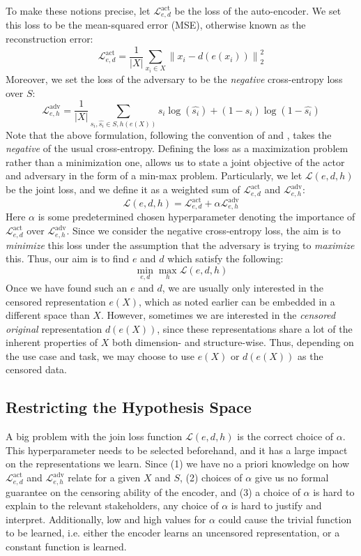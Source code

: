 \documentclass[nohyperref]{article}
\theoremstyle{plain}
\theoremstyle{definition}
\theoremstyle{remark}
\begin{document}
To make these notions precise, let $\mathcal{L}^{\mathop{act}}_{e,d}$ be the loss of the auto-encoder. We set this loss to be the mean-squared error (MSE), otherwise known as the reconstruction error:
\[\mathcal{L}^{\mathop{act}}_{e,d} = \frac{1}{|X|}\sum_{x_i \in X}\left\lVert x_i - d(e(x_i))\right\rVert_2^2\]
Moreover, we set the loss of the adversary to be the \emph{negative} cross-entropy loss over $S$:
\[
\mathcal{L}^{\mathop{adv}}_{e,h} = \frac{1}{|X|} \sum_{s_i, \hat{s_i} \in S, h(e(X))} s_i \mathop{log}(\hat{s_i}) + (1-s_i) \mathop{log}(1-\hat{s_i})
\]
Note that the above formulation, following the convention of \cite{edwards2016censoring} and \cite{pmlr-v80-madras18a}, takes the \emph{negative} of the usual cross-entropy. Defining the loss as a maximization problem rather than a minimization one, allows us to state a joint objective of the actor and adversary in the form of a min-max problem. Particularly, we let $\mathcal{L}(e,d,h)$ be the joint loss, and we define it  as a weighted sum of $\mathcal{L}^{\mathop{act}}_{e,d}$ and $\mathcal{L}^{\mathop{adv}}_{e,h}$:
\[\mathcal{L}(e,d,h) = \mathcal{L}^{\mathop{act}}_{e,d} + \alpha \mathcal{L}^{\mathop{adv}}_{e,h} \]
Here $\alpha$ is some predetermined chosen hyperparameter denoting the importance of $\mathcal{L}^{\mathop{act}}_{e,d}$ over $\mathcal{L}^{\mathop{adv}}_{e,h}$. Since we consider the negative cross-entropy loss, the aim is to \emph{minimize} this loss under the assumption that the adversary is trying to \emph{maximize} this. Thus, our aim is to find $e$ and $d$ which satisfy the following:
\[\min_{e,d}\max_h\mathcal{L}(e,d,h) \]
Once we have found such an $e$ and $d$, we are usually only interested in the censored representation $e(X)$, which as noted earlier can be embedded in a different space than $X$. However, sometimes we are interested in the \emph{censored original} representation $d(e(X))$, since these representations share a lot of the inherent properties of $X$ both dimension- and structure-wise. Thus, depending on the use case and task, we may choose to use $e(X)$ or $d(e(X))$ as the censored data.

\subsection{Restricting the Hypothesis Space}
\label{hypothesis_space}
A big problem with the join loss function $\mathcal{L}(e,d,h)$ is the correct choice of $\alpha$. This hyperparameter needs to be selected beforehand, and it has a large impact on the representations we learn. Since (1) we have no a priori knowledge on how $\mathcal{L}^{\mathop{act}}_{e,d}$ and $\mathcal{L}^{\mathop{adv}}_{e,h}$ relate for a given $X$ and $S$, (2) choices of $\alpha$ give us no formal guarantee on the censoring ability of the encoder, and (3) a choice of $\alpha$ is hard to explain to the relevant stakeholders, any choice of $\alpha$ is hard to justify and interpret. Additionally, low and high values for $\alpha$ could cause the trivial function to be learned, i.e. either the encoder learns an uncensored representation, or a constant function is learned.
\end{document}

